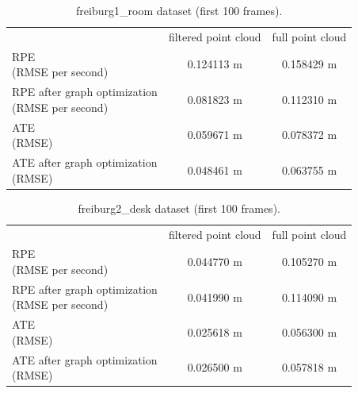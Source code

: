 \begin{center}
\begin{table}[H]
\begin{tabular}{ |l|c|c|}
\hline & filtered point cloud & full point cloud \\
\pbox{20cm} {RPE \\ (RMSE per second)} & 0.124113 m & 0.158429 m \\
\hline
\pbox{20cm}{RPE after graph optimization \\ (RMSE per second)} & 0.081823 m & 0.112310 m\\
\hline
\pbox{20cm} {ATE \\ (RMSE)} & 0.059671 m & 0.078372 m\\
\hline
\pbox{20cm} {ATE after graph optimization \\ (RMSE)} & 0.048461 m & 0.063755 m\\
\hline
\end{tabular}
\caption{freiburg1\_room dataset (first 100 frames).}
\label{table:quantroom}
\end{table}
\end{center}

\begin{center}
\begin{table}[H]
\begin{tabular}{ |l|c|c|}
\hline & filtered point cloud & full point cloud \\
\pbox{20cm}{RPE \\ (RMSE per second)} &  0.044770 m & 0.105270 m\\
\hline
\pbox{20cm} {RPE after graph optimization \\ (RMSE per second)} & 0.041990 m & 0.114090 m\\
\hline
\pbox{20cm} {ATE \\ (RMSE)} & 0.025618 m  & 0.056300 m\\
\hline
\pbox{20cm} {ATE after graph optimization \\ (RMSE)} & 0.026500 m & 0.057818 m \\
\hline
\end{tabular}
\caption{freiburg2\_desk dataset (first 100 frames).}
\label{table:quantfd2}
\end{table}
\end{center}

